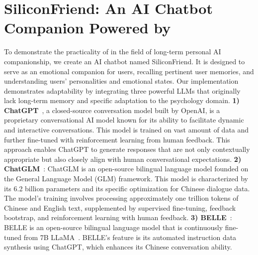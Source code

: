 
\saveSpaceSec
\section{SiliconFriend: An AI Chatbot Companion Powered by \method}
\label{sec:siliconfriend}
\saveSpaceSec

To demonstrate the practicality of \method in the field of long-term personal AI companionship, we create an AI chatbot named SiliconFriend. It is designed to serve as an emotional companion for users, recalling pertinent user memories, and understanding users' personalities and emotional states. Our implementation demonstrates adaptability by integrating three powerful LLMs that originally lack long-term memory and specific adaptation to the psychology domain.
\textbf{1) ChatGPT}~\citep{chatgpt}, a closed-source conversation model built by OpenAI, is a proprietary conversational AI model known for its ability to facilitate dynamic and interactive conversations. This model is trained on vast amount of data and further fine-tuned with reinforcement learning from human feedback. This approach enables ChatGPT to generate responses that are not only contextually appropriate but also closely align with human conversational expectations.
\textbf{2) ChatGLM}~\citep{zeng2022glm}: ChatGLM is an open-source bilingual language model founded on the General Language Model (GLM) framework. This model is characterized by its 6.2 billion parameters and its specific optimization for Chinese dialogue data. The model's training involves processing approximately one trillion tokens of Chinese and English text, supplemented by supervised fine-tuning, feedback bootstrap, and reinforcement learning with human feedback.
\textbf{3) BELLE}~\citep{BELLE}: BELLE is an open-source bilingual language model that is continuously fine-tuned from 7B LLaMA~\citep{touvron2023llama}. BELLE's feature is its automated instruction data synthesis using ChatGPT, which enhances its Chinese conversation ability.


